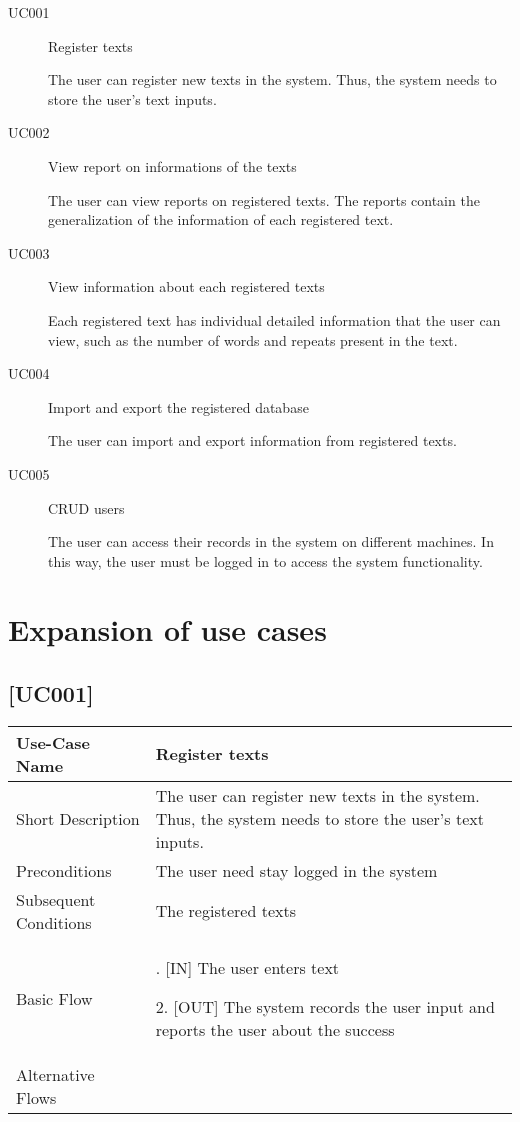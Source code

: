 \documentclass[11pt, twoside, a4paper]{book}
\begin{document}
			\begin{description}
				\item[UC001] Register texts
					
					The user can register new texts in the system. Thus, the system needs to store the user's text inputs.
					
				\item[UC002] View report on informations of the texts
				
					The user can view reports on registered texts. The reports contain the generalization of the information of each registered text.


				\item[UC003] View information about each registered texts
					
					Each registered text has individual detailed information that the user can view, such as the number of words and repeats present in the text.
										
				\item[UC004] Import and export the registered database
					
					The user can import and export information from registered texts.
					
				\item[UC005] CRUD users
					
					The user can access their records in the system on different machines. In this way, the user must be logged in to access the system functionality.
					
			\end{description}

		\section{Expansion of use cases}
			
			\subsection{[UC001]}
				\begin{tabular}{|>{\centering\arraybackslash}m{3cm} |>{\arraybackslash}m{9cm}|}												   \hline
					Use-Case Name 			& Register texts																							\\ \hline
					Short Description  		& The user can register new texts in the system. Thus, the system needs to store the user's text inputs.    \\ \hline	
					Preconditions  			& The user need stay logged in the system      																\\ \hline
					Subsequent Conditions	& The registered texts     																					\\ \hline
					Basic Flow  			& 	1. [IN] The user enters text
										
												2. [OUT] The system records the user input and reports the user about the success								\\ \hline
					Alternative Flows  		&       																									\\ \hline
				\end{tabular}
			
\end{document}
